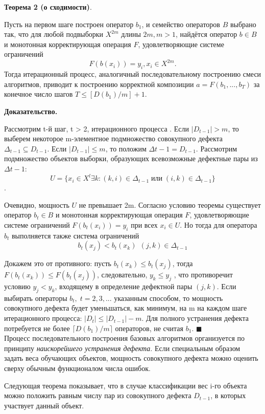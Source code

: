 \documentclass[a4paper,12pt]{article}
\begin{document}
\textbf{Теорема 2 (о сходимости)}. 

Пусть на первом шаге построен оператор $b_1$, и семейство операторов $B$ выбрано так, что для любой подвыборки $X^{2m}$
длины $2m, m > 1$, найдётся оператор $b\in B$ и монотонная корректирующая операция $F$, удовлетворяющие системе ограничений
\[
F(b(x_i)) = y_i
, x_i \in X^{2m}.\]
Тогда итерационный процесс, аналогичный последовательному построению смеси алгоритмов, приводит к построению корректной композиции
$a = F(b_1, . . . , b_T )$ за конечное число шагов $T \leq [D(b_1)/m]+ 1$.


\textbf{Доказательство.}

Рассмотрим t-й шаг, t > 2, итерационного процесса . Если $\vert D_{t-1}\vert > m$,
то выберем некоторое m-элементное подмножество совокупного дефекта $\Delta_{t-1} \subseteq D_{t-1}$.
Если $\vert D_{t-1}\vert \leq m$, то положим $\Delta{t-1} = D_{t-1}$. Рассмотрим подмножество объектов
выборки, образующих всевозможные дефектные пары из $\Delta{t-1}$:
\[ U = \lbrace x_i \in X^l \exists k : (k, i) \in \Delta_{t-1} \; \text{или} \; (i, k) \in \Delta_{t-1} \rbrace\].

Очевидно, мощность $U$ не превышает 2m. Согласно условию теоремы существует оператор $b_t \in B$ и монотонная корректирующая операция $F$, удовлетворяющие системе
ограничений $F(b_t(x_i)) = y_i$ при всех $x_i \in U$. Но тогда для оператора $b_t$ выполняется
также система ограничений
\[ b_t(x_j) < b_t(x_k) \; \, (j, k) \in \Delta_{t-1}\]


Докажем это от противного: пусть $b_t(x_k) \leq b_t(x_j )$, тогда $F(b_t(x_k)) \leq F(b_t(x_j ))$, следовательно, $y_k \leq y_j$
, что противоречит условию $y_j < y_k$, входящему в определение
дефектной пары $(j, k)$.
Если выбирать операторы $b_t , \; t = 2, 3, . . .$ указанным способом, то мощность
совокупного дефекта будет уменьшаться, как минимум, на m на каждом шаге итерационного процесса: $\vert D_t \vert \leq \vert D_{t-1}\vert -m$. Для полного устранения дефекта потребуется не более $\lceil D(b_1)/m\rceil$
операторов, не считая $b_1$. $\blacksquare$
\\

Процесс последовательного построения базовых алгоритмов организуется
по принципу \textit{наискорейшего устранения дефекта}.
Если специальным образом задать веса
обучающих объектов, мощность совокупного дефекта можно оценить сверху
обычным функционалом числа ошибок.

Следующая теорема показывает, что в случае классификации вес i-го объекта
можно положить равным числу пар из совокупного дефекта $D_{t-1}$, в которых участвует данный объект.\\
\end{document}
